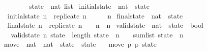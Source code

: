 \begin{isabellebody}
\ \ \ \ \isamarkupfalse%
\isanewline
\ \ \isamarkupfalse%
\isanewline
{}\isamarkupfalse%
%
\endisatagproof
{\isafoldproof}%
%
\isadelimproof
%
\endisadelimproof
%
\isadelimdocument
%
\endisadelimdocument
%
\isatagdocument
%
\isamarkuptrue%
%
\endisatagdocument
{\isafolddocument}%
%
\isadelimdocument
%
\endisadelimdocument
{}\isamarkupfalse%
\ state\ {\isacharequal}\ {\isachardoublequoteopen}nat\ list{\isachardoublequoteclose}\isanewline
\isanewline
{}\isamarkupfalse%
\ initial{\isacharunderscore}state\ {\isacharcolon}{\isacharcolon}\ {\isachardoublequoteopen}nat\ {\isasymRightarrow}\ state{\isachardoublequoteclose}\ \isanewline
\ \ {\isachardoublequoteopen}initial{\isacharunderscore}state\ n\ {\isacharequal}\ {\isacharparenleft}replicate\ {\isacharparenleft}n\ {\isacharplus}\ {}{\isacharparenright}\ {}{\isacharparenright}\ {\isacharbrackleft}{}\ {\isacharcolon}{\isacharequal}\ n{\isacharbrackright}{\isachardoublequoteclose}\isanewline
\isanewline
{}\isamarkupfalse%
\ final{\isacharunderscore}state\ {\isacharcolon}{\isacharcolon}\ {\isachardoublequoteopen}nat\ {\isasymRightarrow}\ state{\isachardoublequoteclose}\ \isanewline
\ \ {\isachardoublequoteopen}final{\isacharunderscore}state\ n\ {\isacharequal}\ {\isacharparenleft}replicate\ {\isacharparenleft}n\ {\isacharplus}\ {}{\isacharparenright}\ {}{\isacharparenright}\ {\isacharbrackleft}n\ {\isacharcolon}{\isacharequal}\ n{\isacharbrackright}{\isachardoublequoteclose}\isanewline
\isanewline
{}\isamarkupfalse%
\ valid{\isacharunderscore}state\ {\isacharcolon}{\isacharcolon}\ {\isachardoublequoteopen}nat\ {\isasymRightarrow}\ state\ {\isasymRightarrow}\ bool{\isachardoublequoteclose}\ \isanewline
\ \ \ {\isachardoublequoteopen}valid{\isacharunderscore}state\ n\ state\ {\isasymlongleftrightarrow}\ length\ state\ {\isacharequal}\ n\ {\isacharplus}\ {}\ {\isasymand}\ sum{\isacharunderscore}list\ state\ {\isacharequal}\ n{\isachardoublequoteclose}\isanewline
\isanewline
{}\isamarkupfalse%
\ move\ {\isacharcolon}{\isacharcolon}\ {\isachardoublequoteopen}nat\ {\isasymRightarrow}\ nat\ {\isasymRightarrow}\ state\ {\isasymRightarrow}\ state{\isachardoublequoteclose}\ \isanewline
\ \ {\isachardoublequoteopen}move\ p{}\ p{}\ state\ {\isacharequal}\ \isanewline

\end{isabellebody}
